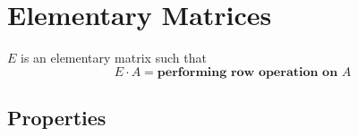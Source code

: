 \section{Elementary Matrices}

\begin{definition}
  $ E $ is an elementary matrix such that 
  \begin{displaymath}
    E \cdot A = \textbf{performing row operation on } A
  \end{displaymath}
\end{definition}

\subsection{Properties}

  